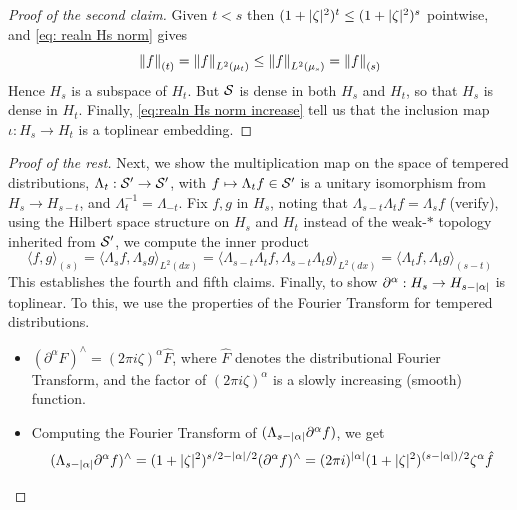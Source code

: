 \documentclass[../main-v2-manifolds.tex]{subfiles}
\begin{document}
\begin{proof}[Proof of the second claim]
Given $t<s$ then $(1+\vert {\zeta} \vert^2)^{t}\leq (1+\vert {\zeta} \vert^2)^{s}$ pointwise, and \cref{eq: realn Hs norm} gives
\begin{equation}
\norm{f}_{(t)} = \norm{f}_{L^2(\mu_t)}\leq \norm{f}_{L^2(\mu_s)} = \norm{f}_{(s)}
\label{eq:realn Hs norm increase}
\end{equation}
Hence $H_s$ is a subspace of  $H_t$. But $\mathcal{S}$ is dense in both $H_s$ and $H_t$, so that $H_s$ is dense in $H_t$. Finally, \cref{eq:realn Hs norm increase} tell us that the inclusion map $\iota: H_s\to H_t$ is a toplinear embedding.
\end{proof}
\begin{proof}[Proof of the rest]
Next, we show the multiplication map on the space of tempered distributions, $\Lambda_t: \mathcal{S}'\to \mathcal{S}'$, with $f\mapsto \Lambda_t f\in \mathcal{S}'$ is a unitary isomorphism from $H_s\to H_{s-t}$, and $\Lambda_t^{-1} = \Lambda_{-t}$. Fix $f,g$ in $H_s$, noting that $\Lambda_{s-t}\Lambda_{t} f = \Lambda_s f$ (verify), using the Hilbert space structure on $H_s$ and $H_t$ instead of the weak-$\ast$ topology inherited from $\mathcal{S}'$, we compute the inner product
\[
\langle f,g\rangle_{(s)}= \langle \Lambda_s f,\Lambda_s g \rangle_{L^2(dx)}
= \langle\Lambda_{s-t}\Lambda_{t} f, \Lambda_{s-t}\Lambda_{t} g  \rangle_{L^2(dx)}= \langle \Lambda_t f,\Lambda_t g \rangle_{(s-t)}
\]
This establishes the fourth and fifth claims. Finally, to show $\partial^\alpha: H_s\to H_{s-\vert {\alpha} \vert}$ is toplinear. To this, we use the properties of the Fourier Transform for tempered distributions.
\begin{itemize}
    \item $(\partial^\alpha F)^{\wedge} = (2\pi i \zeta)^{\alpha}\hat{F}$, where $\hat{F}$ denotes the distributional Fourier Transform, and the factor of $(2\pi  i \zeta)^{\alpha}$ is a slowly increasing (smooth) function.
    \item Computing the Fourier Transform of $(\Lambda_{s-\vert {\alpha} \vert}\partial^\alpha f)$, we get
    \[
    (\Lambda_{s-\vert {\alpha} \vert}\partial^\alpha f)^{\wedge} = (1+\vert {\zeta} \vert^2)^{s/2 - \vert {\alpha} \vert/2}(\partial^\alpha f)^{\wedge}
    = (2\pi i)^{\vert {\alpha} \vert}(1+\vert {\zeta} \vert^2)^{(s-\vert {\alpha} \vert)/2} \zeta^\alpha\hat{f}
    \]
\end{itemize}


\end{proof}
\end{document}
